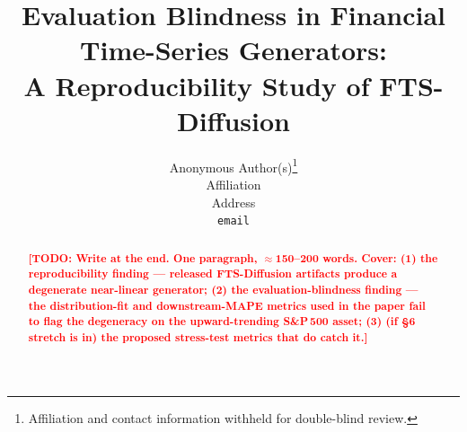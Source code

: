 \documentclass{article}
\title{Evaluation Blindness in Financial Time-Series Generators:\\
A Reproducibility Study of FTS-Diffusion}
\author{%
  Anonymous Author(s)\thanks{Affiliation and contact information withheld for double-blind review.} \\
  Affiliation \\
  Address \\
  \texttt{email}
}
\newcommand{\todo}[1]{\textcolor{red}{\textbf{[TODO: #1]}}}
\begin{document}
\maketitle

\begin{abstract}
\todo{Write at the end. One paragraph, $\approx$150--200 words. Cover: (1) the
reproducibility finding — released FTS-Diffusion artifacts produce a degenerate
near-linear generator; (2) the evaluation-blindness finding — the
distribution-fit and downstream-MAPE metrics used in the paper fail to flag the
degeneracy on the upward-trending S\&P\,500 asset; (3) (if \S6 stretch is in)
the proposed stress-test metrics that do catch it.}
\end{abstract}













\appendix



\end{document}
